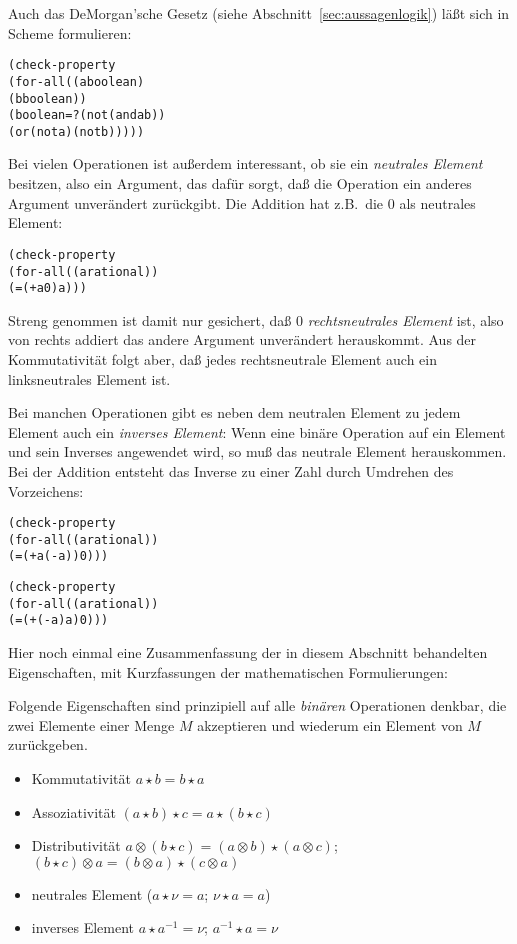 Auch das \textrm{DeMorgan'sche Gesetz}
(siehe Abschnitt~\ref{sec:aussagenlogik}) läßt sich in Scheme
formulieren:
%
\begin{alltt}
(check-property
 (for-all ((a boolean)
           (b boolean))
   (boolean=? (not (and a b))
              (or (not a) (not b)))))
\end{alltt}
%
Bei vielen Operationen ist außerdem interessant, ob sie ein
\textit{neutrales Element} besitzen, also ein
Argument, das dafür sorgt, daß die Operation ein anderes Argument
unverändert zurückgibt.  Die Addition hat z.B.\ die $0$ als neutrales
Element:
%
\begin{alltt}
(check-property
  (for-all ((a rational))
    (= (+ a 0) a)))
\end{alltt}
%
Streng genommen ist damit nur gesichert, daß $0$ \textit{rechtsneutrales
  Element} ist, also von rechts addiert das andere Argument
unverändert herauskommt.  Aus der Kommutativität folgt aber, daß jedes
rechtsneutrale Element auch ein linksneutrales Element ist.

Bei manchen Operationen gibt es neben dem neutralen Element zu jedem
Element auch ein \textit{inverses Element}:
Wenn eine binäre Operation auf ein Element und sein Inverses
angewendet wird, so muß das neutrale Element herauskommen.  Bei der
Addition entsteht das Inverse zu einer Zahl durch Umdrehen des
Vorzeichens:
%
\begin{alltt}
(check-property
 (for-all ((a rational))
   (= (+ a (- a)) 0)))

(check-property
 (for-all ((a rational))
   (= (+ (- a) a) 0)))
\end{alltt}
%
Hier noch einmal eine Zusammenfassung der in diesem Abschnitt
behandelten Eigenschaften, mit Kurzfassungen der mathematischen
Formulierungen:

\begin{mantra}
%
Folgende Eigenschaften sind prinzipiell auf alle \textit{binären}
Operationen denkbar, die zwei Elemente einer Menge $M$ akzeptieren
und wiederum ein Element von $M$ zurückgeben.
\begin{itemize}
\item Kommutativität $a \star b = b \star a$
\item Assoziativität $(a \star b) \star c = a \star (b \star c)$
\item Distributivität $a \otimes (b \star c) = (a \otimes b) \star (a
  \otimes c)$; $(b \star c) \otimes a = (b \otimes a) \star (c
  \otimes a)$
\item neutrales Element ($a\star \nu = a$; $\nu\star a = a$)
\item inverses Element $a\star a^{-1} = \nu$; $a^{-1}\star a = \nu$
\end{itemize}
\end{mantra}

